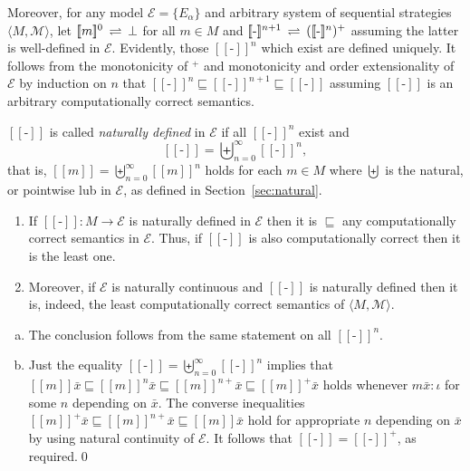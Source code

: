 \documentclass[fleqn]{LMCS}
\theoremstyle{plain}\newtheorem{satz}[thm]{Satz}
\theoremstyle{plain}\newtheorem{hyp}[thm]{Hypothesis}
\theoremstyle{plain}\newtheorem{hyps}[thm]{Hypotheses}
\theoremstyle{definition}\newtheorem{note}[thm]{Note}
\newcommand{\EE}{\mathcal{E}}
\newcommand{\defis}{\mbox{-}}
\newcommand{\setof}[1]{\{#1\}}
\newcommand{\bYdef}{\mathrel{\BYDEF}}
\newcommand{\BYDEF}{\mbox{$\hspace{.2em}\rightleftharpoons\hspace{.2em}$}}
\newcommand{\pointwiselub}{\biguplus}
\newcommand{\arr}{\rightarrow}
\newcommand{\la}{\langle}
\newcommand{\ra}{\rangle}
\newcommand{\Dsem}[1]{[\![ #1 ]\!]}
\newcommand{\tuple}[1]{\la #1 \ra}
\newcommand{\Undef}{{\perp}}
\newcommand{\MM}{{\mathcal M}}
\newcommand{\bx}{\bar{x}}
\newcommand{\?}{\mbox{?}}
\begin{document}
Moreover, for any model $\EE=\setof{E_\alpha}$ 
and arbitrary system of sequential strategies $\tuple{M,\MM}$,
let $\Dsem{m}^0\bYdef\Undef$ 
for all $m\in M$ 
and 
$\Dsem{\defis}^{n+1}\bYdef(\Dsem{\defis}^{n})^+$ 
assuming the latter is 
well-defined in $\EE$. 
Evidently, those $\Dsem{\defis}^{n}$ which exist are defined uniquely. 
It follows from the monotonicity of $^+$ and monotonicity and order extensionality 
of $\EE$ by induction on $n$ that 
$\Dsem{\defis}^{n}\sqsubseteq\Dsem{\defis}^{n+1}\sqsubseteq\Dsem{\defis}$ 
assuming $\Dsem{\defis}$ is an arbitrary computationally correct semantics. 
\begin{defi}\label{def:natural-defined}$\Dsem{\defis}$ is called \emph{naturally defined} in $\EE$ if 
all $\Dsem{\defis}^n$ exist and 
\[
\Dsem{\defis}=\pointwiselub_{n=0}^{\infty}\Dsem{\defis}^n,
\]
that is, 
$\Dsem{m}=\pointwiselub_{n=0}^{\infty}\Dsem{m}^n$ holds for each $m\in M$ 
where $\pointwiselub$ is the natural, 
or pointwise lub in $\EE$, as defined in Section~\ref{sec:natural}. 
\end{defi}
\begin{prop}\label{prop:natural-sem}\hfill
\begin{enumerate}[\em(a)]
\item If 
$\Dsem{\defis}:M\arr\EE$ is naturally defined in $\EE$ 
then it is $\sqsubseteq$ any computationally correct semantics in $\EE$. 
Thus, if $\Dsem{\defis}$ is also computationally correct then it is the least one. 

\item Moreover, 
if $\EE$ is naturally continuous and $\Dsem{\defis}$ is naturally defined then it 
is, indeed,  
the least computationally correct semantics of $\tuple{M,\MM}$.
\end{enumerate}

\end{prop}
\proof \hfill
\begin{enumerate}[(a)]
\item The conclusion follows from the same statement on all $\Dsem{\defis}^n$. 

\item Just the equality 
$\Dsem{\defis}=\pointwiselub_{n=0}^{\infty}\Dsem{\defis}^n$ 
implies that  
$\Dsem{m}\bx
\sqsubseteq\Dsem{m}^n\bx
\sqsubseteq\Dsem{m}^{n+}\bx
\sqsubseteq\Dsem{m}^+\bx$ 
holds whenever $m\bx:\iota$ for some $n$ depending on $\bx$.  
The converse inequalities 
$\Dsem{m}^+\bx\sqsubseteq\Dsem{m}^{n+}\bx\sqsubseteq\Dsem{m}\bx$ hold 
for appropriate $n$ depending on $\bx$ by using natural continuity of  $\EE$. 
It follows that $\Dsem{\defis}=\Dsem{\defis}^+$, as required.\qed
\end{enumerate}
\end{document}
